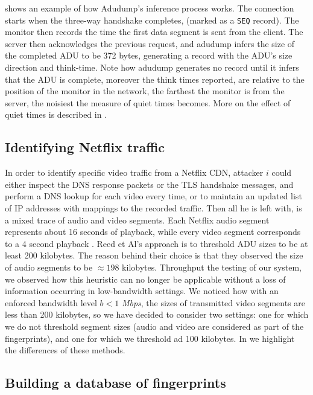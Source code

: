  shows an example of how Adudump's inference process works.
The connection starts when the three-way handshake completes, (marked as a
\texttt{SEQ} record). The monitor then records the time the first data segment
is sent from the client. The server then acknowledges the previous request, and
adudump infers the size of the completed ADU to be 372 bytes, generating a
record with the ADU's size direction and think-time. Note how adudump generates
no record until it infers that the ADU is complete, moreover the think times
reported, are relative to the position of the monitor in the network, the
farthest the monitor is from the server, the noisiest the measure of quiet
times becomes. More on the effect of quiet times is described in
.

\subsection{Identifying Netflix traffic}\label{dns}

In order to identify specific video traffic from a Netflix CDN, attacker $i$
could either inspect the DNS response packets or the TLS handshake messages,
and perform a DNS lookup for each video every time, or to maintain an updated
list of IP addresses with mappings to the recorded traffic. Then all he is left
with, is a mixed trace of audio and video segments. Each Netflix audio segment
represents about 16 seconds of playback, while every video segment corresponds
to a 4 second playback \cite{netflix-real-time}.  Reed et Al's approach is to
threshold ADU sizes to be at least 200 kilobytes.  The reason behind their
choice is that they observed the size of audio segments to be $\approx 198$
kilobytes. Throughput the testing of our system, we observed how this heuristic
can no longer be applicable without a loss of information occurring in
low-bandwidth settings. We noticed how with an enforced bandwidth level $b < 1$
\emph{Mbps}, the sizes of transmitted video segments are less than 200
kilobytes, so we have decided to consider two settings: one for which we do not
threshold segment sizes (audio and video are considered as part of the
fingerprints), and one for which we threshold ad 100 kilobytes. In
 we highlight the differences of these methods.

\subsection{Building a database of fingerprints}

